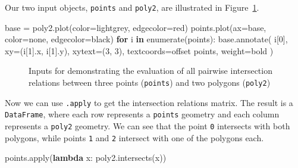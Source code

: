 \documentclass[
  letterpaper,
]{krantz}
\newenvironment{Shaded}{\begin{snugshade}}{\end{snugshade}}
\newcommand{\BuiltInTok}[1]{\textcolor[rgb]{0.00,0.23,0.31}{#1}}
\newcommand{\ControlFlowTok}[1]{\textcolor[rgb]{0.00,0.23,0.31}{\textbf{#1}}}
\newcommand{\DecValTok}[1]{\textcolor[rgb]{0.68,0.00,0.00}{#1}}
\newcommand{\KeywordTok}[1]{\textcolor[rgb]{0.00,0.23,0.31}{\textbf{#1}}}
\newcommand{\NormalTok}[1]{\textcolor[rgb]{0.00,0.23,0.31}{#1}}
\newcommand{\OperatorTok}[1]{\textcolor[rgb]{0.37,0.37,0.37}{#1}}
\newcommand{\StringTok}[1]{\textcolor[rgb]{0.13,0.47,0.30}{#1}}
\begin{document}
Our two input objects, \texttt{points} and \texttt{poly2}, are
illustrated in Figure~\ref{fig-spatial-relations-geoms2}.

\begin{Shaded}
\begin{Highlighting}[]
\NormalTok{base }\OperatorTok{=}\NormalTok{ poly2.plot(color}\OperatorTok{=}\StringTok{\textquotesingle{}lightgrey\textquotesingle{}}\NormalTok{, edgecolor}\OperatorTok{=}\StringTok{\textquotesingle{}red\textquotesingle{}}\NormalTok{)}
\NormalTok{points.plot(ax}\OperatorTok{=}\NormalTok{base, color}\OperatorTok{=}\StringTok{\textquotesingle{}none\textquotesingle{}}\NormalTok{, edgecolor}\OperatorTok{=}\StringTok{\textquotesingle{}black\textquotesingle{}}\NormalTok{)}
\ControlFlowTok{for}\NormalTok{ i }\KeywordTok{in} \BuiltInTok{enumerate}\NormalTok{(points):}
\NormalTok{    base.annotate(}
\NormalTok{        i[}\DecValTok{0}\NormalTok{], xy}\OperatorTok{=}\NormalTok{(i[}\DecValTok{1}\NormalTok{].x, i[}\DecValTok{1}\NormalTok{].y), }
\NormalTok{        xytext}\OperatorTok{=}\NormalTok{(}\DecValTok{3}\NormalTok{, }\DecValTok{3}\NormalTok{), textcoords}\OperatorTok{=}\StringTok{\textquotesingle{}offset points\textquotesingle{}}\NormalTok{, weight}\OperatorTok{=}\StringTok{\textquotesingle{}bold\textquotesingle{}}
\NormalTok{    )}
\end{Highlighting}
\end{Shaded}

\begin{figure}[H]


\caption{\label{fig-spatial-relations-geoms2}Inputs for demonstrating
the evaluation of all pairwise intersection relations between three
points (\texttt{points}) and two polygons (\texttt{poly2})}

\end{figure}%

Now we can use \texttt{.apply} to get the intersection relations matrix.
The result is a \texttt{DataFrame}, where each row represents a
\texttt{points} geometry and each column represents a \texttt{poly2}
geometry. We can see that the point \texttt{0} intersects with both
polygons, while points \texttt{1} and \texttt{2} intersect with one of
the polygons each.

\begin{Shaded}
\begin{Highlighting}[]
\NormalTok{points.}\BuiltInTok{apply}\NormalTok{(}\KeywordTok{lambda}\NormalTok{ x: poly2.intersects(x))}
\end{Highlighting}
\end{Shaded}
\end{document}
